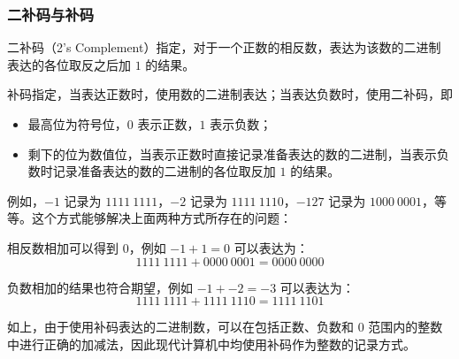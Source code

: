         \subsubsection{二补码与补码}\label{subsubsec:ArithBasics/positional-notation-presentation/binary/two-complement}
            二补码（2's Complement）指定，对于一个正数的相反数，表达为该数的二进制表达的各位取反之后加 $1$ 的结果。

            补码指定，当表达正数时，使用数的二进制表达；当表达负数时，使用二补码，即
            \begin{itemize}
                \item 最高位为符号位，$0$ 表示正数，$1$ 表示负数；
                \item 剩下的位为数值位，当表示正数时直接记录准备表达的数的二进制，当表示负数时记录准备表达的数的二进制的各位取反加 $1$ 的结果。
            \end{itemize}

            例如，$-1$ 记录为 $1111\ 1111$，$-2$ 记录为 $1111\ 1110$，$-127$ 记录为 $1000\ 0001$，等等。这个方式能够解决上面两种方式所存在的问题：

            相反数相加可以得到 $0$，例如 $-1 + 1 = 0$ 可以表达为：
            \[1111\ 1111 + 0000\ 0001 = 0000\ 0000\]

            负数相加的结果也符合期望，例如 $-1 + -2 = -3$ 可以表达为：
            \[1111\ 1111 + 1111\ 1110 = 1111\ 1101\]

            如上，由于使用补码表达的二进制数，可以在包括正数、负数和 0 范围内的整数中进行正确的加减法，因此现代计算机中均使用补码作为整数的记录方式。
